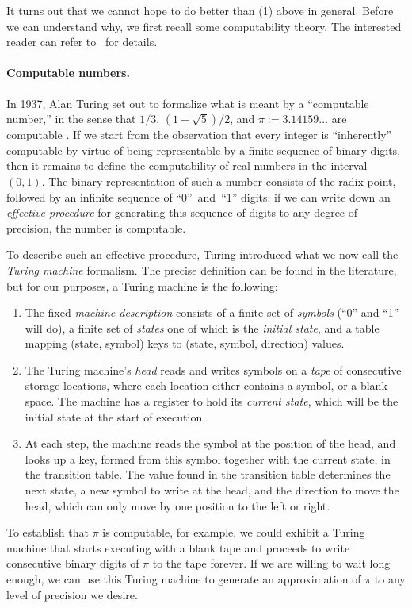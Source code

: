 \documentclass[../generics]{subfiles}
\begin{document}
It turns out that we cannot hope to do better than (1) above in general. Before we can understand why, we first recall some computability theory. The interested reader can refer to~\cite{cutland} for details.

\paragraph{Computable numbers.}
In 1937, Alan Turing set out to formalize what is meant by a ``computable number,'' in the sense that $1/3$, $(1+\sqrt{5})/2$, and $\pi := 3.14159\ldots$ are computable \cite{turing}. If we start from the observation that every integer is ``inherently'' computable by virtue of being representable by a finite sequence of binary digits, then it remains to define the computability of real numbers in the interval $(0,1)$. The binary representation of such a number consists of the radix point, followed by an infinite sequence of ``0''~and~``1'' digits; if we can write down an \emph{effective procedure} for generating this sequence of digits to any degree of precision, the number is computable.

To describe such an effective procedure, Turing introduced what we now call the  \emph{Turing machine} formalism. The precise definition can be found in the literature, but for our purposes, a Turing machine is the following:
\begin{enumerate}
\item The fixed \emph{machine description} consists of a finite set of \emph{symbols} (``0'' and ``1'' will do), a finite set of \emph{states} one of which is the \emph{initial state}, and a table mapping (state, symbol) keys to (state, symbol, direction) values.

\item The Turing machine's \emph{head} reads and writes symbols on a \emph{tape} of consecutive storage locations, where each location either contains a symbol, or a blank space. The machine has a register to hold its \emph{current state}, which will be the initial state at the start of execution.

\item At each step, the machine reads the symbol at the position of the head, and looks up a key, formed from this symbol together with the current state, in the transition table. The value found in the transition table determines the next state, a new symbol to write at the head, and the direction to move the head, which can only move by one position to the left or right.
\end{enumerate}
To establish that $\pi$ is computable, for example, we could exhibit a Turing machine that starts executing with a blank tape and proceeds to write consecutive binary digits of $\pi$ to the tape forever. If we are willing to wait long enough, we can use this Turing machine to generate an approximation of $\pi$ to any level of precision we desire.
\end{document}

